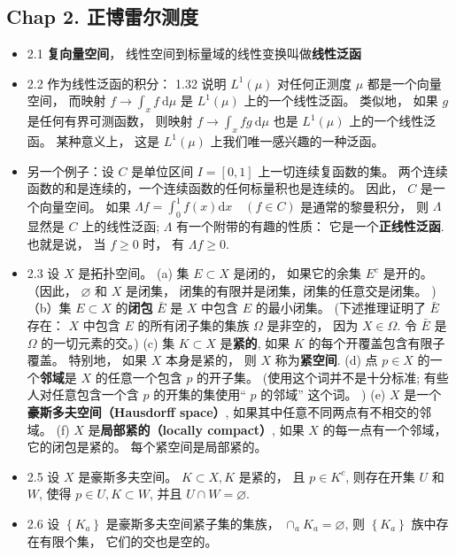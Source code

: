 \subsection{Chap 2. 正博雷尔测度}
\begin{itemize}
\item 2.1 \textbf{复向量空间}， 线性空间到标量域的线性变换叫做\textbf{线性泛函}

\item 2.2 作为线性泛函的积分： 1.32 说明 $L^1(\mu)$ 对任何正测度 $\mu$ 都是一个向量空间， 而映射 $f \rightarrow \int_{x} f \mathrm{~d} \mu$ 是 $L^1(\mu)$ 上的一个线性泛函。 类似地， 如果 $g$ 是任何有界可测函数， 则映射 $f \rightarrow \int_{x} f g \mathrm{~d} \mu$ 也是 $L^1(\mu)$ 上的一个线性泛函。 某种意义上， 这是 $L^1(\mu)$ 上我们唯一感兴趣的一种泛函。

\item 另一个例子：设 $C$ 是单位区间 $I=[0,1]$ 上一切连续复函数的集。 两个连续函数的和是连续的，一个连续函数的任何标量积也是连续的。 因此， $C$ 是一个向量空间。 如果 $\Lambda f=\int_{0}^{1} f(x) \mathrm{d} x \quad(f \in C)$ 是通常的黎曼积分， 则 $\Lambda$ 显然是 $C$ 上的线性泛函; $\Lambda$ 有一个附带的有趣的性质： 它是一个\textbf{正线性泛函}. 也就是说， 当 $f \geqslant 0$ 时， 有 $\Lambda f \geqslant 0$.

\item 2.3 设 $X$ 是拓扑空间。 (a) 集 $E \subset X$ 是闭的， 如果它的余集 $E^{c}$ 是开的。 （因此， $\varnothing$ 和 $X$ 是闭集， 闭集的有限并是闭集，闭集的任意交是闭集。 )（b）集 $E \subset X$ 的\textbf{闭包} $\bar{E}$ 是 $X$ 中包含 $E$ 的最小闭集。 (下述推理证明了 $\bar{E}$ 存在： $X$ 中包含 $E$ 的所有闭子集的集族 $\Omega$ 是非空的， 因为 $X \in \Omega$. 令 $\bar{E}$ 是 $\Omega$ 的一切元素的交。) (c) 集 $K \subset X$ 是\textbf{紧的}, 如果 $K$ 的每个开覆盖包含有限子覆盖。 特别地， 如果 $X$ 本身是紧的， 则 $X$ 称为\textbf{紧空间}. (d) 点 $p \in X$ 的一个\textbf{邻域}是 $X$ 的任意一个包含 $p$ 的开子集。 (使用这个词并不是十分标准; 有些人对任意包含一个含 $p$ 的开集的集使用“ $p$ 的邻域” 这个词。 ) (e) $X$ 是一个\textbf{豪斯多夫空间（Hausdorff space）}, 如果其中任意不同两点有不相交的邻域。 (f) $X$ 是\textbf{局部紧的（locally compact）}, 如果 $X$ 的每一点有一个邻域， 它的闭包是紧的。 每个紧空间是局部紧的。

\item 2.5 设 $X$ 是豪斯多夫空间。 $K \subset X, K$ 是紧的， 且 $p \in K^{c}$, 则存在开集 $U$ 和 $W$, 使得 $p \in U, K \subset W$, 并且 $U \cap W=\varnothing$.

\item 2.6 设 $\left\{K_{a}\right\}$ 是豪斯多夫空间紧子集的集族， $\cap_{a} K_{a}=\varnothing$, 则 $\left\{K_{a}\right\}$ 族中存在有限个集， 它们的交也是空的。


\end{itemize}
